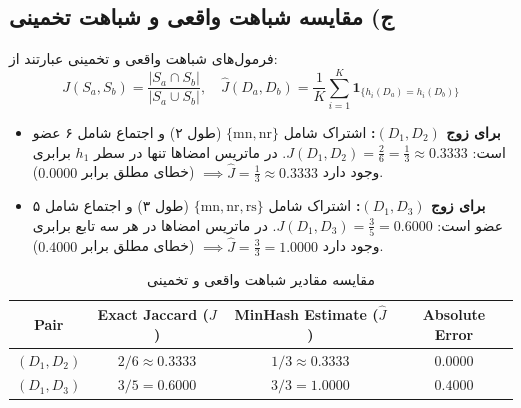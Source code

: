 \documentclass[11pt,a4paper]{article}
\begin{document}
	\subsection{ج) مقایسه شباهت واقعی  و شباهت تخمینی }
	فرمول‌های شباهت واقعی و تخمینی عبارتند از:
	\begin{equation}
		J(S_a, S_b) = \frac{|S_a \cap S_b|}{|S_a \cup S_b|}, \quad \hat{J}(D_a, D_b) = \frac{1}{K} \sum_{i=1}^{K} \mathbf{1}_{\{h_i(D_a) = h_i(D_b)\}}
	\end{equation}
	
	\begin{itemize}
		\item \textbf{برای زوج $(D_1, D_2)$:}
		اشتراک شامل $\{\text{mn}, \text{nr}\}$ (طول ۲) و اجتماع شامل ۶ عضو است: $J(D_1, D_2) = \frac{2}{6} = \frac{1}{3} \approx 0.3333$.
		در ماتریس امضاها تنها در سطر $h_1$ برابری وجود دارد $\implies \hat{J} = \frac{1}{3} \approx 0.3333$ (خطای مطلق برابر $0.0000$).
		
		\item \textbf{برای زوج $(D_1, D_3)$:}
		اشتراک شامل $\{\text{mn}, \text{nr}, \text{rs}\}$ (طول ۳) و اجتماع شامل ۵ عضو است: $J(D_1, D_3) = \frac{3}{5} = 0.6000$.
		در ماتریس امضاها در هر سه تابع برابری وجود دارد $\implies \hat{J} = \frac{3}{3} = 1.0000$ (خطای مطلق برابر $0.4000$).
	\end{itemize}
	
	\begin{table}[H]
		\centering
		\small
		\renewcommand{\arraystretch}{1.35}
		\caption{مقایسه مقادیر شباهت واقعی و تخمینی}
		\vspace{0.15cm}
		\begin{latin}
			\begin{tabular}{cccc}
				\toprule
				\rowcolor{headerBg}
				\textbf{Pair} & \textbf{Exact Jaccard ($J$)} & \textbf{MinHash Estimate ($\hat{J}$)} & \textbf{Absolute Error} \\
				\midrule
				$(D_1, D_2)$ & $2/6 \approx 0.3333$ & $1/3 \approx 0.3333$ & $0.0000$ \\
				$(D_1, D_3)$ & $3/5 = 0.6000$ & $3/3 = 1.0000$ & $0.4000$ \\
				\bottomrule
			\end{tabular}
		\end{latin}
	\end{table}
	
\end{document}
